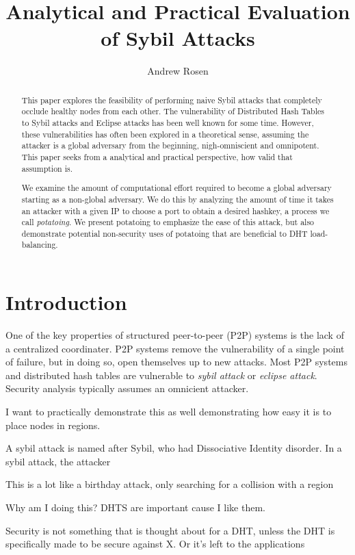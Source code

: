 \documentclass[10pt,a4paper]{article}
\author{Andrew Rosen}
\title{Analytical and Practical Evaluation of Sybil Attacks}
\begin{document}
\maketitle

\begin{abstract}
This paper explores the feasibility of performing naive Sybil attacks that completely occlude healthy nodes from each other.
The vulnerability of Distributed Hash Tables to Sybil attacks and Eclipse attacks has been well known for some time.
However, these vulnerabilities has often been explored in a theoretical sense, assuming the attacker is a global adversary from the beginning, nigh-omniscient and omnipotent. 
This paper seeks from a analytical and practical perspective, how valid that assumption is.

We examine the amount of computational effort required to become a global adversary starting as a non-global adversary.
We do this by analyzing the amount of time it takes an attacker with a given IP to choose a port to obtain a desired hashkey, a process we call \emph{potatoing}.
We present potatoing to emphasize the ease of this attack, but also demonstrate potential non-security uses of potatoing that are beneficial to DHT load-balancing. 
\end{abstract}

\section{Introduction}
One of the key properties of structured peer-to-peer (P2P) systems is the lack of a centralized coordinater.
P2P systems remove the vulnerability of a single point of failure, but in doing so, open themselves up to new attacks.
Most P2P systems and distributed hash tables are vulnerable to 
\textit{sybil attack} or \textit{eclipse attack}.
Security analysis typically assumes an omnicient attacker. 

I want to practically demonstrate this as well demonstrating how easy it is to place nodes in regions.

A sybil attack is named after Sybil, who had Dissociative Identity disorder.
In a sybil attack, the attacker

This is a lot like a birthday attack, only searching for a collision with a region

Why am I doing this?
DHTS are important cause I like them.

Security is not something that is thought about for a DHT, unless the 
DHT is specifically made to be secure against X.  
Or it's left to the applications
\end{document}
